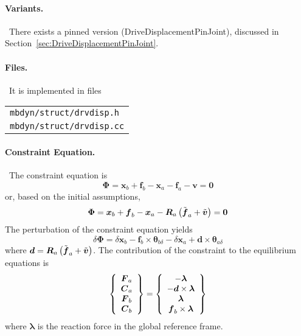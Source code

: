 \documentclass[10pt,dvips,fleqn,subeqn]{report}
\newcommand{\T}[1]{\boldsymbol{#1}}
\begin{document}
\paragraph{Variants.} \
There exists a pinned version (DriveDisplacementPinJoint),
discussed in Section~\ref{sec:DriveDisplacementPinJoint}.

\paragraph{Files.} \
It is implemented in files

\begin{tabular}{l}
\texttt{mbdyn/struct/drvdisp.h} \\
\texttt{mbdyn/struct/drvdisp.cc}
\end{tabular}

\paragraph{Constraint Equation.} \
The constraint equation is
\begin{equation}
	\T{\Phi} = \T{x}_b + \T{f}_b - \T{x}_a - \T{f}_a - \T{v} = \T{0}
\end{equation}
or, based on the initial assumptions,
\begin{equation}
	\T{\Phi} = \T{x}_b + \T{f}_b - \T{x}_a
		- \T{R}_a\plbr{\tilde{\T{f}}_a + \tilde{\T{v}}} = \T{0}
\end{equation}
The perturbation of the constraint equation yields
\begin{equation}
	\delta\T{\Phi} = 
		\delta\T{x}_b
		- \T{f}_b\times\T{\theta}_{b\delta}
		- \delta\T{x}_a
		+ \T{d}\times\T{\theta}_{a\delta}
\end{equation}
where $\T{d}=\T{R}_a\plbr{\tilde{\T{f}}_a + \tilde{\T{v}}}$.
The contribution of the constraint to the equilibrium equations is
\begin{equation}
	\cubr{\cvvect{
		\T{F}_a \\
		\T{C}_a \\
		\T{F}_b \\
		\T{C}_b
	}} = \cubr{\cvvect{
		- \T{\lambda} \\
		- \T{d}\times\T{\lambda} \\
		\T{\lambda} \\
		\T{f}_b\times\T{\lambda}
	}}
\end{equation}
where $\T{\lambda}$ is the reaction force in the global reference frame.
\end{document}
